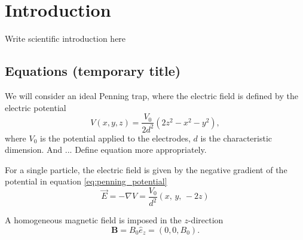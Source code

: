 \section{Introduction}\label{sec:introduction}
%
Write scientific introduction here 

\subsection*{Equations (temporary title)}
We will consider an ideal Penning trap, where the electric field is defined by the electric potential 
\begin{equation}
    V(x,y,z) = \frac{V_0}{2d^2}(2z^2 - x^2 - y^2), \label{eq:penning_potential}
\end{equation}
where $V_0$ is the potential applied to the electrodes, $d$ is the characteristic dimension. And ... Define equation more appropriately. 

For a single particle, the electric field is given by the negative gradient of the potential in equation \eqref{eq:penning_potential}
\begin{equation}
    \vec{E} = -\nabla V = \frac{V_0}{d^2} (x,\,y,\,-2z) \label{eq:p1_E_field_pot_gradient}
\end{equation}

A homogeneous magnetic field is imposed in the $z$-direction 
\begin{equation}
    \mathbf{B}= B_0 \hat{e}_z = (0,0,B_0). \label{eq:homogeneous_B_field}
\end{equation}

